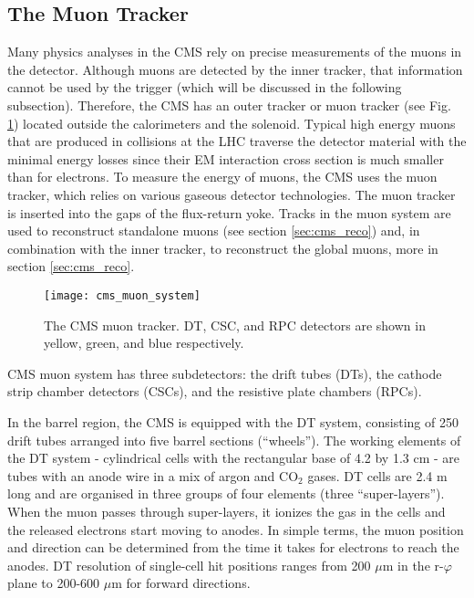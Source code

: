 \begin{normalsize}

\subsection{The Muon Tracker}

Many physics analyses in the CMS rely on precise measurements of the muons in the detector. Although muons are detected by the inner tracker, that information cannot be used by the trigger (which will be discussed in the following subsection). Therefore, the CMS has an outer tracker or muon tracker \cite{Muon_system_TDR} (see Fig. \ref{cms_muon_system}) located outside the calorimeters and the solenoid. Typical high energy muons that are produced in collisions at the LHC traverse the detector material with the minimal energy losses since their EM interaction cross section is much smaller than for electrons. To measure the energy of muons, the CMS uses the muon tracker, which relies on various gaseous detector technologies. The muon tracker is inserted into the gaps of the flux-return yoke. Tracks in the muon system are used to reconstruct standalone muons (see section \ref{sec:cms_reco}) and, in combination with the inner tracker, to reconstruct the global muons, more in section \ref{sec:cms_reco}.



 \begin{figure}[H]
  \centering
  \texttt{[image: cms\_muon\_system]}
  \caption[The CMS muon tracker]{The CMS muon tracker. DT, CSC, and RPC detectors are shown in yellow, green, and blue respectively.}
  \label{cms_muon_system}
\end{figure}

CMS muon system has three subdetectors: the drift tubes (DTs), the cathode strip chamber detectors (CSCs), and the resistive plate chambers (RPCs). 

In the barrel region, the CMS is equipped with the DT system, consisting of 250 drift tubes arranged into five barrel sections (``wheels''). The working elements of the DT system - cylindrical cells with the rectangular base of 4.2 by 1.3 cm - are tubes with an anode wire in a mix of argon and CO$_2$ gases. DT cells are 2.4 m long and are organised in three groups of four elements (three ``super-layers''). When the muon passes through super-layers, it ionizes the gas in the cells and the released electrons start moving to anodes. In simple terms, the muon position and direction can be determined from the time it takes for electrons to reach the anodes. DT resolution of single-cell hit positions ranges from 200 $\mu$m in the r-$\varphi$ plane to 200-600 $\mu$m for forward directions. 


\end{normalsize}
